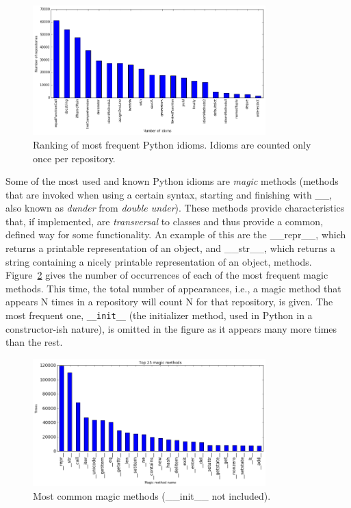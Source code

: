 \documentclass[a4paper]{article}
\begin{document}
\begin{figure}[ht]
\centering
\includegraphics[width=90mm]{img/num_idiom_repo.png}
\caption{Ranking of most frequent Python idioms. Idioms are counted only once per repository.}
\label{fig:idiom_ranking}
\end{figure}

Some of the most used and known Python idioms are \emph{magic} methods (methods that are invoked when using a certain syntax, starting and finishing with \_\_, also known as \emph{dunder} from \emph{double under}). These methods provide characteristics that, if implemented, are \emph{transversal} to classes and thus provide a common, defined way for some functionality. An example of this are the \_\_repr\_\_, which returns a printable representation of an object, and \_\_str\_\_, which returns a string containing a nicely printable representation of an object, methods. Figure~\ref{fig:magic_ranking} gives the number of occurrences of each of the most frequent magic methods. This time, the total number of appearances, i.e., a magic method that appears N times in a repository will count N for that repository, is given. The most frequent one, \verb|__init__| (the initializer method, used in Python in a constructor-ish nature), is omitted in the figure as it appears many more times than the rest.

\begin{figure}[ht]
\centering
\includegraphics[width=90mm]{img/magic_methods.png}
\caption{Most common magic methods (\_\_init\_\_ not included).}
\label{fig:magic_ranking}
\end{figure}
\end{document}
